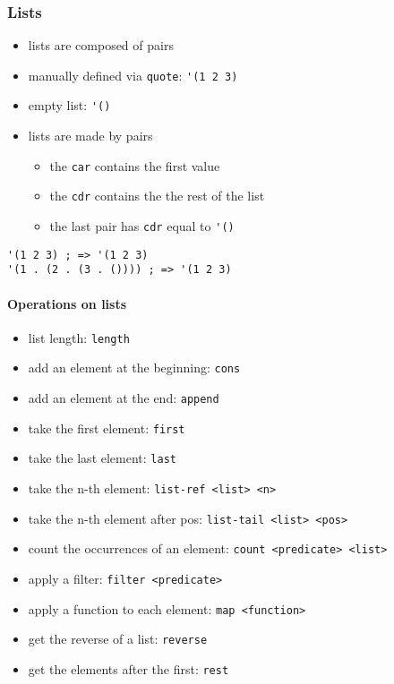\documentclass[a4paper,landscape,10pt]{article}
\begin{document}
\begin{multicols*}{2}
  \subsubsection{Lists}

  \begin{itemize}
    \item lists are composed of pairs
    \item manually defined via \lstinline[language=Racket]!quote!: \lstinline[language=Racket]!'(1 2 3)!
    \item empty list: \lstinline[language=Racket]!'()!
    \item lists are made by pairs
          \begin{itemize} \item the \lstinline[language=Racket]!car! contains the first value
            \item the \lstinline[language=Racket]!cdr! contains the the rest of the list
            \item the last pair has \lstinline[language=Racket]!cdr! equal to \lstinline[language=Racket]!'()!
          \end{itemize}
  \end{itemize}

  \begin{lstlisting}[language=Racket]
'(1 2 3) ; => '(1 2 3)
'(1 . (2 . (3 . ()))) ; => '(1 2 3)
\end{lstlisting}

  \paragraph{Operations on lists}

  \begin{itemize}
    \item list length: \lstinline[language=Racket]!length!
    \item add an element at the beginning: \lstinline[language=Racket]!cons!
    \item add an element at the end: \lstinline[language=Racket]!append!
    \item take the first element: \lstinline[language=Racket]!first!
    \item take the last element: \lstinline[language=Racket]!last!
    \item take the n-th element: \lstinline[language=Racket]!list-ref <list> <n>!
    \item take the n-th element after pos: \lstinline[language=Racket]!list-tail <list> <pos>!
    \item count the occurrences of an element: \lstinline[language=Racket]!count <predicate> <list>!
    \item apply a filter: \lstinline[language=Racket]!filter <predicate>!
    \item apply a function to each element: \lstinline[language=Racket]!map <function>!
    \item get the reverse of a list: \lstinline[language=Racket]!reverse!
    \item get the elements after the first: \lstinline[language=Racket]!rest!
  \end{itemize}


\end{multicols*}
\end{document}
